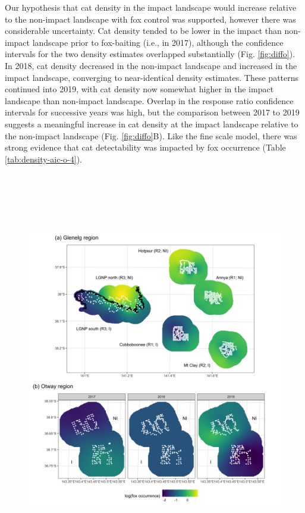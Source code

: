 \documentclass[11pt,a4paper,titlepage,twoside,openright]{style/unimelbthesis}
\begin{document}
\begin{mainmatter}
Our hypothesis that cat density in the impact landscape would increase relative to the non-impact landscape with fox control was supported, however there was considerable uncertainty. Cat density tended to be lower in the impact than non-impact landscape prior to fox-baiting (i.e., in 2017), although the confidence intervals for the two density estimates overlapped substantially (Fig. \ref{fig:diffo}). In 2018, cat density decreased in the non-impact landscape and increased in the impact landscape, converging to near-identical density estimates. These patterns continued into 2019, with cat density now somewhat higher in the impact landscape than non-impact landscape. Overlap in the response ratio confidence intervals for successive years was high, but the comparison between 2017 to 2019 suggests a meaningful increase in cat density at the impact landscape relative to the non-impact landscape (Fig. \ref{fig:diffo}B). Like the fine scale model, there was strong evidence that cat detectability was impacted by fox occurrence (Table \ref{tab:density-aic-o-4}).

\newpage

\(~\)

\(~\)

\(~\)
\begin{figure}

{\centering \includegraphics[width=1\linewidth]{figure/fox_occ_map} 

}
\end{figure}
\end{mainmatter}
\end{document}
